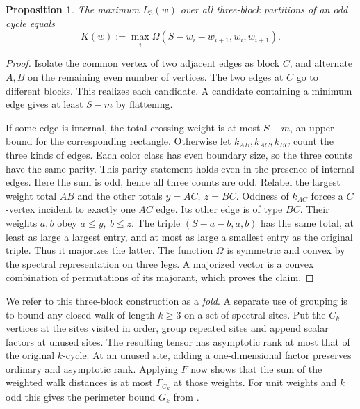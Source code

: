 \documentclass[11pt,a4paper]{article}
\newtheorem{proposition}[theorem]{Proposition}
\theoremstyle{definition}
\begin{document}
\begin{proposition}\label{prop:folds}
The maximum \(L_3(w)\) over all three-block partitions of an odd cycle equals
\[
 K(w):=\max_i \Omega(S-w_i-w_{i+1},w_i,w_{i+1}).
\]
\end{proposition}
\begin{proof}
Isolate the common vertex of two adjacent edges as block \(C\), and alternate \(A,B\) on the remaining even number of vertices. The two edges at \(C\) go to different blocks. This realizes each candidate. A candidate containing a minimum edge gives at least \(S-m\) by flattening.

If some edge is internal, the total crossing weight is at most \(S-m\), an upper bound for the corresponding rectangle. Otherwise let \(k_{AB},k_{AC},k_{BC}\) count the three kinds of edges. Each color class has even boundary size, so the three counts have the same parity. This parity statement holds even in the presence of internal edges. Here the sum is odd, hence all three counts are odd. Relabel the largest weight total \(AB\) and the other totals \(y=AC,\ z=BC\). Oddness of \(k_{AC}\) forces a \(C\)-vertex incident to exactly one \(AC\) edge. Its other edge is of type \(BC\). Their weights \(a,b\) obey \(a\le y,\ b\le z\). The triple \((S-a-b,a,b)\) has the same total, at least as large a largest entry, and at most as large a smallest entry as the original triple. Thus it majorizes the latter. The function \(\Omega\) is symmetric and convex by the spectral representation on three legs. A majorized vector is a convex combination of permutations of its majorant, which proves the claim.
\end{proof}

We refer to this three-block construction as a \emph{fold}. A separate use of grouping is to bound any closed walk of length \(k\ge3\) on a set of spectral sites. Put the \(C_k\) vertices at the sites visited in order, group repeated sites and append scalar factors at unused sites. The resulting tensor has asymptotic rank at most that of the original \(k\)-cycle. At an unused site, adding a one-dimensional factor preserves ordinary and asymptotic rank. Applying \(F\) now shows that the sum of the weighted walk distances is at most \(\Gamma_{C_k}\) at those weights. For unit weights and \(k\) odd this gives the perimeter bound \(G_k\) from \cite{Jiang}.
\end{document}
